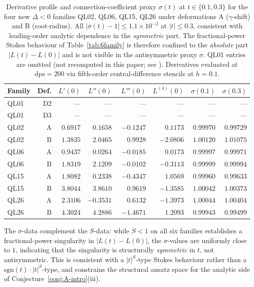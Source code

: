 \documentclass[11pt,reqno]{amsart}
\theoremstyle{definition}
\begin{document}
\begin{table}[h]
\centering
\small
\begin{tabular}{lrrrrrrr}
\toprule
Family & Def. & $L'(0)$ & $L''(0)$ & $L'''(0)$ & $L^{(4)}(0)$
& $\sigma(0.1)$ & $\sigma(0.3)$ \\
\midrule
QL01 & D2 & --- & --- & --- & --- & --- & --- \\
QL01 & D3 & --- & --- & --- & --- & --- & --- \\
QL02 & A  & $0.6917$  & $0.1658$   & $-0.1247$ & $\phantom{-}0.1173$ & $0.99970$ & $0.99729$ \\
QL02 & B  & $1.3835$  & $2.0465$   & $\phantom{-}0.9928$  & $-2.0806$ & $1.00120$ & $1.01075$ \\
QL06 & A  & $0.9437$  & $0.0264$   & $-0.0185$ & $\phantom{-}0.0173$ & $0.99997$ & $0.99971$ \\
QL06 & B  & $1.8319$  & $2.1209$   & $-0.0102$ & $-0.3113$ & $0.99999$ & $0.99994$ \\
QL15 & A  & $1.8082$  & $0.2338$   & $-0.4347$ & $\phantom{-}1.0569$ & $0.99960$ & $0.99633$ \\
QL15 & B  & $3.8044$  & $3.8610$   & $\phantom{-}0.9619$  & $-1.3585$ & $1.00042$ & $1.00373$ \\
QL26 & A  & $2.3106$  & $-0.3531$  & $\phantom{-}0.6132$  & $-1.3973$ & $1.00044$ & $1.00404$ \\
QL26 & B  & $4.3024$  & $4.2886$   & $-1.4671$ & $\phantom{-}1.2093$ & $0.99943$ & $0.99499$ \\
\bottomrule
\end{tabular}
\caption{Derivative profile and connection-coefficient proxy
$\sigma(t)$ at $t\in\{0.1,0.3\}$ for the four new
$\Delta<0$ families QL02, QL06, QL15, QL26 under deformations
A ($\gamma$-shift) and B (root-radius). All
$|\sigma(t)-1|\le 1.1\times 10^{-2}$ at $|t|\le 0.3$,
consistent with leading-order analytic dependence in the
\emph{symmetric} part. The fractional-power Stokes
behaviour of Table~\ref{tab:6family} is therefore confined
to the \emph{absolute} part $|L(t)-L(0)|$ and is not visible
in the antisymmetric proxy $\sigma$. QL01 entries are
omitted (not recomputed in this paper; see
\cite{Papanokechi2026Vquad}).
Derivatives evaluated at $\mathrm{dps}=200$ via fifth-order
central-difference stencils at $h=0.1$.}
\label{tab:diag-derivs}
\end{table}

The $\sigma$-data complement the $S$-data: while $S<1$ on
all six families establishes a fractional-power singularity
in $|L(t)-L(0)|$, the $\sigma$-values are uniformly close
to $1$, indicating that the singularity is structurally
\emph{symmetric} in $t$, not antisymmetric. This is consistent
with a $|t|^{S}$-type Stokes behaviour rather than a
$\mathrm{sgn}(t)\cdot|t|^{S}$-type, and constrains the
structural ansatz space for the analytic side of
Conjecture~\ref{conj:A-intro}(iii).
\end{document}
